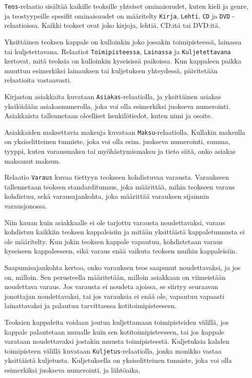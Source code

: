\documentclass[12pt,titlepage] {article}
\begin{document}
\texttt{Teos}-relaatio sisältää kaikille teoksille yhteiset ominaisuudet, kuten kieli ja genre, ja teostyypeille spesifit ominaisuudet on määritelty \texttt{Kirja}, \texttt{Lehti}, \texttt{CD} ja \texttt{DVD} -relaatioissa. Kaikki teokset ovat joko kirjoja, lehtiä, CD:itä tai DVD:itä.

Yksittäinen teoksen kappale on kulloinkin joko jossakin toimipisteessä, lainassa tai kuljetettavana. Relaatiot \texttt{Toimipisteessa}, \texttt{Lainassa} ja \texttt{Kuljetettavana} kertovat, mitä teoksia on kulloinkin kyseisissä paikoissa. Kun kappaleen paikka muuttuu esimerkiksi lainauksen tai kuljetuksen yhteydessä, päivitetään relaatioita vastaavasti.

Kirjaston asiakkaita kuvataan \texttt{Asiakas}-relaatiolla, ja yksittäinen asiakas yksilöidään asiakasnumerolla, joka voi olla esimerkiksi juokseva numerointi. Asiakkaista tallennetaan oleelliset henkilötiedot, kuten nimi ja osoite.

Asiakkaiden maksettavia maksuja kuvataan \texttt{Maksu}-relaatiolla. Kullakin maksulla on yksiselitteinen tunniste, joka voi olla esim. juokseva numerointi, summa, tyyppi, kuten varausmaksu tai myöhästymismaksu ja tieto siitä, onko asiakas maksanut maksun.

Relaatio \texttt{Varaus} kuvaa tiettyyn teokseen kohdistuvaa varausta. Varaukseen tallennetaan teoksen standarditunnus, joka määrittää, mihin teokseen varaus kohdistuu, sekä varausajankohta, joka määrittää varauksen sijainnin varausjonossa. 

Niin kauan kuin asiakkaalle ei ole tarjottu varausta noudettavaksi, varaus kohdistuu kaikkiin teoksen kappaleisiin ja mitään yksittäistä kappaletunnusta ei ole määritelty. Kun jokin teoksen kappale vapautuu, kohdistetaan varaus kyseiseen kappaleeseen, eikä varaus enää vaikuta teoksen muihin kappaleisiin. 

Saapumisajankohta kertoo, onko varauksen teos saapunut noudettavaksi, ja jos on, milloin. Sen perusteella määritetään, milloin asiakkaan on viimeistään noudettava varaus. Jos varausta ei noudeta ajoissa, se siirtyy seuraavan jonottajan noudettavaksi, tai jos varauksia ei enää ole, vapautuu vapaasti lainattavaksi ja palautuu tarvittaessa kotitoimipisteeseen.

Teoksien kappaleita voidaan joutua kuljettamaan toimipisteiden välillä, jos kappale palautetaan muualle kuin sen kotitoimipisteeseen, tai jos kappale varataan noudettavaksi jostakin muusta toimipisteestä. Kuljetuksia kahden toimipisteen välillä kuvataan \texttt{Kuljetus}-relaatiolla, jonka monikko vastaa yksittäistä kuljetusta. Kuljetuksella on yksiselitteinen tunniste, joka voi olla esimerkiksi juokseva numerointi, ja lähtöaika.
\end{document}
